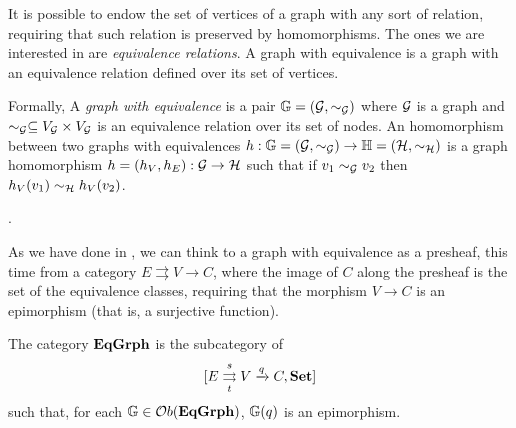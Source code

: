 It is possible to endow the set of vertices of a graph with any sort of relation, requiring that such relation is preserved by homomorphisms. The ones we are interested in are \emph{equivalence relations}.
A graph with equivalence is a graph with an equivalence relation defined over its set of vertices.

Formally,  A \emph{graph with equivalence} is a pair $\mathbb{G} = (\mathcal{G}, \sim_{\mathcal{G}})$ where $\mathcal{G}$ is a graph and $\sim_{\mathcal{G}} \subseteq V_{\mathcal{G}}\times V_{\mathcal{G}}$ is an equivalence relation over its set of nodes. An homomorphism between two graphs with equivalences $h :\mathbb{G} = (\mathcal{G}, \sim_{\mathcal{G}})\rightarrow \mathbb{H} = (\mathcal{H}, \sim_{\mathcal{H}})$ is a graph homomorphism $h = (h_V, h_E):\mathcal{G} \rightarrow \mathcal{H}$ such that if $v_1 \sim_{\mathcal{G}} v_2$ then $h_V(v_1) \sim_{\mathcal{H}} h_V(v_2)$.

.

As we have done in , we can think to a graph with equivalence as a presheaf, this time from a category $E \rightrightarrows V \rightarrow C$, where the image of $C$ along the presheaf is the set of the equivalence classes, requiring that the morphism $V\rightarrow C$ is an epimorphism (that is, a surjective function).



\begin{definition}
    The category $\mathbf{EqGrph}$ is the subcategory of $$[E \mathrel{\mathop{\rightrightarrows}^{s}_{t}} V \xrightarrow{q} C, \mathbf{Set}]$$ such that, for each $\mathbb{G} \in \mathcal{O}b(\mathbf{EqGrph})$, $\mathbb{G}(q)$ is an epimorphism. 
\end{definition}

